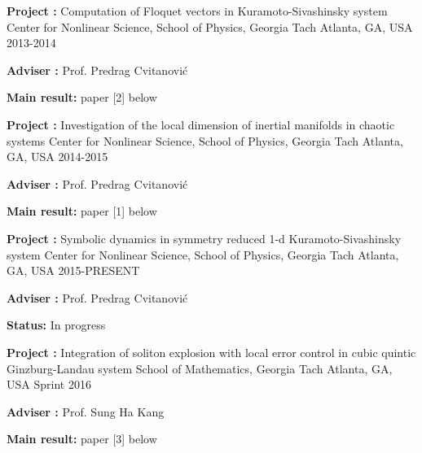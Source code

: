 


\begin{cventries}


\cventry
{\textbf{Project :} Computation of Floquet vectors in Kuramoto-Sivashinsky system} %
{Center for Nonlinear Science, School of Physics, Georgia Tach} %
{Atlanta, GA, USA} %
{2013-2014} %
{
  \begin{cvitems}
    \item {\textbf{Adviser :} Prof. Predrag Cvitanovi\'c}
    \item {\textbf{Main result:} paper [2] below}
  \end{cvitems}
}

\cventry
{\textbf{Project :} Investigation of the local dimension of inertial manifolds in chaotic systems} 
{Center for Nonlinear Science, School of Physics, Georgia Tach} 
{Atlanta, GA, USA} %
{2014-2015} %
{
  \begin{cvitems}
    \item {\textbf{Adviser :} Prof. Predrag Cvitanovi\'c}
    \item {\textbf{Main result:} paper [1] below}
  \end{cvitems}
}

\cventry
{\textbf{Project :} Symbolic dynamics in symmetry reduced 1-d Kuramoto-Sivashinsky system} 
{Center for Nonlinear Science, School of Physics, Georgia Tach} 
{Atlanta, GA, USA} %
{2015-PRESENT} %
{
  \begin{cvitems}
    \item {\textbf{Adviser :} Prof. Predrag Cvitanovi\'c}
    \item {\textbf{Status:} In progress }
  \end{cvitems}
}


\cventry
{\textbf{Project :} Integration of soliton explosion with local error control in cubic quintic 
  Ginzburg-Landau system} 
{School of Mathematics, Georgia Tach} 
{Atlanta, GA, USA} %
{Sprint 2016} %
{
  \begin{cvitems}
  \item {\textbf{Adviser :} Prof. Sung Ha Kang}
  \item {\textbf{Main result:}  paper [3] below}
  \end{cvitems}
}



\end{cventries}
